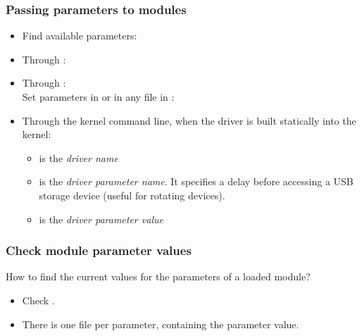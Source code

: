 \begin{frame}
  \frametitle{Passing parameters to modules}
  \begin{itemize}
  \item Find available parameters:\\
  \item Through :\\
  \item Through :\\
    Set parameters in  or in any file in :\\
  \item Through the kernel command line, when the driver is built statically into the kernel:\\
    \begin{itemize}
    \item {} is the {\em driver name}
    \item {} is the {\em driver parameter name}. It
      specifies a delay before accessing a USB storage device (useful for
      rotating devices).
    \item {} is the {\em driver parameter value}
    \end{itemize}
  \end{itemize}
\end{frame}

\begin{frame}
  \frametitle{Check module parameter values}
  How to find the current values for the parameters of a loaded module?
  \begin{itemize}
  \item Check .
  \item There is one file per parameter, containing the parameter value.
  \end{itemize}
\end{frame}

